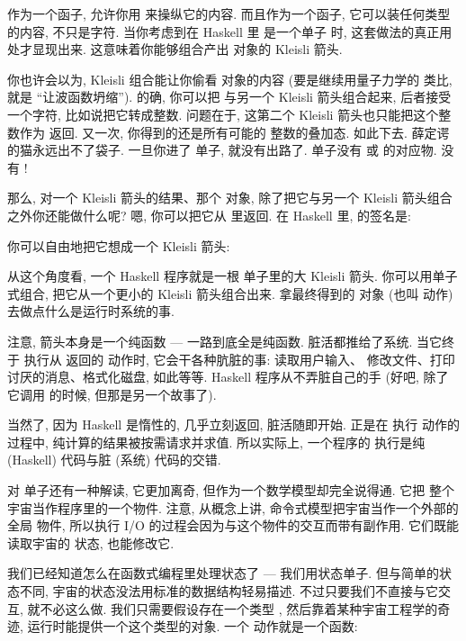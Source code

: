  作为一个函子, 允许你用  来操纵它的内容. 而且作为一个函子,
它可以装任何类型的内容, 不只是字符. 当你考虑到在 Haskell 里  是一个单子
时, 这套做法的真正用处才显现出来. 这意味着你能够组合产出  对象的
Kleisli 箭头.

你也许会以为, Kleisli 组合能让你偷看  对象的内容 (要是继续用量子力学的
类比, 就是 ``让波函数坍缩''). 的确, 你可以把  与另一个 Kleisli
箭头组合起来, 后者接受一个字符, 比如说把它转成整数. 问题在于, 这第二个 Kleisli
箭头也只能把这个整数作为  返回. 又一次, 你得到的还是所有可能的
整数的叠加态. 如此下去. 薛定谔的猫永远出不了袋子. 一旦你进了  单子,
就没有出路了.  单子没有  或  的对应物.
没有 !

那么, 对一个 Kleisli 箭头的结果、那个  对象, 除了把它与另一个 Kleisli
箭头组合之外你还能做什么呢? 嗯, 你可以把它从  里返回. 在 Haskell 里,
 的签名是:

你可以自由地把它想成一个 Kleisli 箭头:

从这个角度看, 一个 Haskell 程序就是一根  单子里的大 Kleisli 箭头.
你可以用单子式组合, 把它从一个更小的 Kleisli 箭头组合出来. 拿最终得到的
 对象 (也叫  动作) 去做点什么是运行时系统的事.

注意, 箭头本身是一个纯函数 --- 一路到底全是纯函数. 脏活都推给了系统. 当它终于
执行从  返回的  动作时, 它会干各种肮脏的事: 读取用户输入、
修改文件、打印讨厌的消息、格式化磁盘, 如此等等. Haskell 程序从不弄脏自己的手
(好吧, 除了它调用  的时候, 但那是另一个故事了).

当然了, 因为 Haskell 是惰性的,  几乎立刻返回, 脏活随即开始. 正是在
执行  动作的过程中, 纯计算的结果被按需请求并求值. 所以实际上, 一个程序的
执行是纯 (Haskell) 代码与脏 (系统) 代码的交错.

对  单子还有一种解读, 它更加离奇, 但作为一个数学模型却完全说得通. 它把
整个宇宙当作程序里的一个物件. 注意, 从概念上讲, 命令式模型把宇宙当作一个外部的全局
物件, 所以执行 I/O 的过程会因为与这个物件的交互而带有副作用. 它们既能读取宇宙的
状态, 也能修改它.

我们已经知道怎么在函数式编程里处理状态了 --- 我们用状态单子. 但与简单的状态不同,
宇宙的状态没法用标准的数据结构轻易描述. 不过只要我们不直接与它交互, 就不必这么做.
我们只需要假设存在一个类型 , 然后靠着某种宇宙工程学的奇迹,
运行时能提供一个这个类型的对象. 一个  动作就是一个函数:

